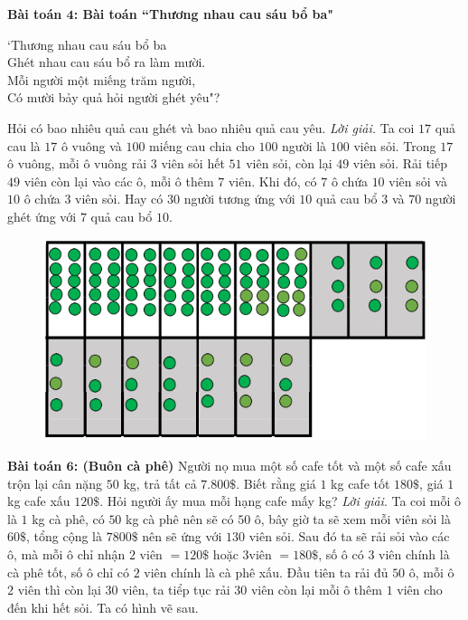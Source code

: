 \begin{multicols}{2}
\begin{figure}[H]
		\vspace*{-15pt}
	\end{figure}
	\textbf{\color{diendantoanhoc}Bài toán $\pmb4$: Bài toán ``Thương nhau cau sáu bổ ba"}
	\begin{center}
		`Thương nhau cau sáu bổ ba\\
		Ghét nhau cau sáu bổ ra làm mười.\\
		Mỗi người một miếng trăm người,\\
		Có mười bảy quả hỏi người ghét yêu"?
	\end{center}
	Hỏi có bao nhiêu quả cau ghét và bao nhiêu quả cau yêu.
	\vskip 0.1cm
	\textit{Lời giải.}
	Ta coi $17$ quả cau là $17$ ô vuông và $100$ miếng cau chia cho $100$ người là $100$ viên sỏi. Trong $17$ ô vuông, mỗi ô vuông rải $3$ viên sỏi hết $51$ viên sỏi, còn lại $49$ viên sỏi. Rải tiếp $49$ viên còn lại vào các ô, mỗi ô thêm $7$ viên. Khi đó, có $7$ ô chứa $10$ viên sỏi và $10$ ô chứa $3$ viên sỏi. Hay có $30$ người tương ứng với $10$ quả cau bổ $3$ và $70$ người ghét ứng với $7$ quả cau bổ $10$.
	\begin{figure}[H]
		\vspace*{-5pt}
		\centering
		\captionsetup{labelformat= empty, justification=centering}
		\includegraphics[width= 1\linewidth]{4}
		\vspace*{-15pt}
	\end{figure}
	\textbf{\color{diendantoanhoc}Bài toán $\pmb6$: (Buôn cà phê)}
	\vskip 0.1cm
	Người nọ mua một số cafe tốt và một số cafe xấu trộn lại cân nặng $50$ kg, trả tất cả $7.800\$$. Biết rằng giá $1$ kg cafe tốt $180\$$, giá $1$ kg cafe xấu $120\$$. Hỏi người ấy mua mỗi hạng cafe mấy kg?
	\vskip 0.1cm
	\textit{Lời giải}.
	Ta coi mỗi ô là $1$ kg cà phê, có $50$ kg cà phê nên sẽ có $50$ ô, bây giờ ta sẽ xem mỗi viên sỏi là $60\$$, tổng cộng là $7800\$$ nên sẽ ứng với $130$ viên sỏi. Sau đó ta sẽ rải sỏi vào các ô, mà mỗi ô chỉ nhận $2$ viên $=120\$$ hoặc $3 $viên $=180\$$, số ô có $3$ viên chính là cà phê tốt, số ô chỉ có $2$ viên chính là cà phê xấu. Đầu tiên ta rải đủ $50$ ô, mỗi ô $2$ viên thì còn lại $30$ viên, ta tiểp tục rải $30$ viên còn lại mỗi ô thêm $1$ viên cho đến khi hết sỏi. Ta có hình vẽ sau.

\end{multicols}
